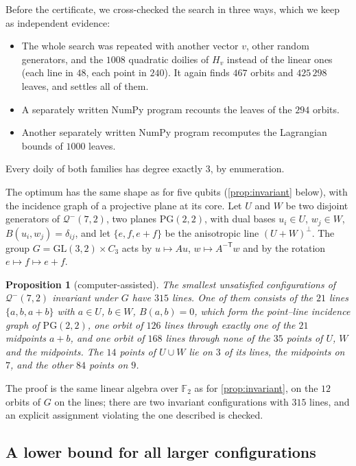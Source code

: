 \documentclass[11pt]{article}
\newtheorem{proposition}[proposition]{Proposition}
\theoremstyle{definition}
\theoremstyle{remark}
\newcommand{\F}{\mathbb{F}}
\newcommand{\Qm}{\mathcal{Q}^{-}}
\begin{document}
Before the certificate, we cross-checked the search in three ways, which we keep as independent evidence:
\begin{itemize}[leftmargin=*]
\item The whole search was repeated with another vector $v$, other random generators, and the $1008$ quadratic doilies of $H_v$ instead of the linear ones (each line in $48$, each point in $240$). It again finds $467$ orbits and $425\,298$ leaves, and settles all of them.
\item A separately written NumPy program recounts the leaves of the $294$ orbits.
\item Another separately written NumPy program recomputes the Lagrangian bounds of $1000$ leaves.
\end{itemize}
Every doily of both families has degree exactly $3$, by enumeration.

The optimum has the same shape as for five qubits (\cref{prop:invariant} below), with the incidence graph of a projective plane at its core.
Let $U$ and $W$ be two disjoint generators of $\Qm(7,2)$, two planes $\mathrm{PG}(2,2)$, with dual bases $u_i\in U$, $w_j\in W$, $B(u_i,w_j)=\delta_{ij}$, and let $\{e,f,e+f\}$ be the anisotropic line $(U+W)^\perp$.
The group $G=\mathrm{GL}(3,2)\times C_3$ acts by $u\mapsto Au$, $w\mapsto A^{-\mathsf T}w$ and by the rotation $e\mapsto f\mapsto e+f$.

\begin{proposition}[computer-assisted]\label{prop:ellinvariant}
The smallest unsatisfied configurations of $\Qm(7,2)$ invariant under $G$ have $315$ lines.
One of them consists of the $21$ lines $\{a,b,a+b\}$ with $a\in U$, $b\in W$, $B(a,b)=0$, which form the point--line incidence graph of $\mathrm{PG}(2,2)$, one orbit of $126$ lines through exactly one of the $21$ midpoints $a+b$, and one orbit of $168$ lines through none of the $35$ points of $U$, $W$ and the midpoints.
The $14$ points of $U\cup W$ lie on $3$ of its lines, the midpoints on $7$, and the other $84$ points on $9$.
\end{proposition}

The proof is the same linear algebra over $\F_2$ as for \cref{prop:invariant}, on the $12$ orbits of $G$ on the lines; there are two invariant configurations with $315$ lines, and an explicit assignment violating the one described is checked.

\subsection{A lower bound for all larger configurations}
\end{document}
